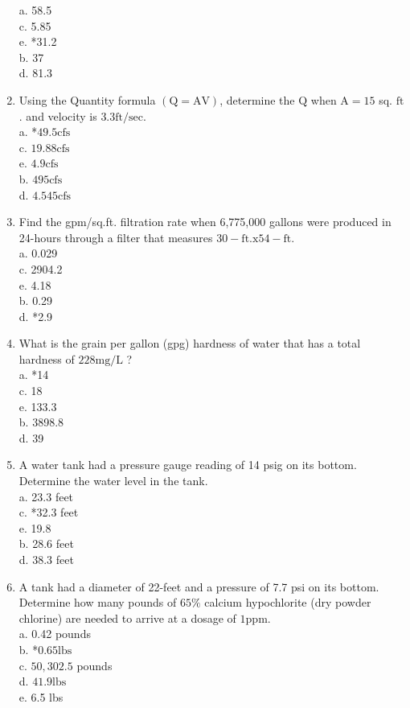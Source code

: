 \begin{enumerate}
a. 58.5\\
c. 5.85\\
e. *31.2\\
b. 37\\
d. 81.3\\
  \item Using the Quantity formula $(\mathrm{Q}=\mathrm{AV})$, determine the $\mathrm{Q}$ when $\mathrm{A}=15$ sq. $\mathrm{ft}$. and velocity is $3.3 \mathrm{ft} / \mathrm{sec}$.\\
a. *$49.5 \mathrm{cfs}$\\
c. $19.88 \mathrm{cfs}$\\
e. $4.9 \mathrm{cfs}$\\
b. $495 \mathrm{cfs}$\\
d. $4.545 \mathrm{cfs}$\\
  \item Find the gpm/sq.ft. filtration rate when 6,775,000 gallons were produced in 24-hours through a filter that measures $30-\mathrm{ft} . \mathrm{x} 54-\mathrm{ft}$.\\
a. 0.029\\
c. 2904.2\\
e. 4.18\\
b. 0.29\\
d. *2.9 

\item What is the grain per gallon (gpg) hardness of water that has a total hardness of $228 \mathrm{mg} / \mathrm{L}$ ?\\
a. *14\\
c. 18\\
e. 133.3\\
b. 3898.8\\
d. 39\\
  \item A water tank had a pressure gauge reading of 14 psig on its bottom. Determine the water level in the tank.\\
a. 23.3 feet\\
c. *32.3 feet\\
e. 19.8\\
b. 28.6 feet\\
d. 38.3 feet\\
  \item A tank had a diameter of 22-feet and a pressure of 7.7 psi on its bottom. Determine how many pounds of $65 \%$ calcium hypochlorite (dry powder chlorine) are needed to arrive at a dosage of $1 \mathrm{ppm}$.\\
a. 0.42 pounds\\
b. *$0.65 \mathrm{lbs}$\\
c. $50,302.5$ pounds\\
d. $41.9 \mathrm{lbs}$\\
e. 6.5 lbs\\


\end{enumerate}
